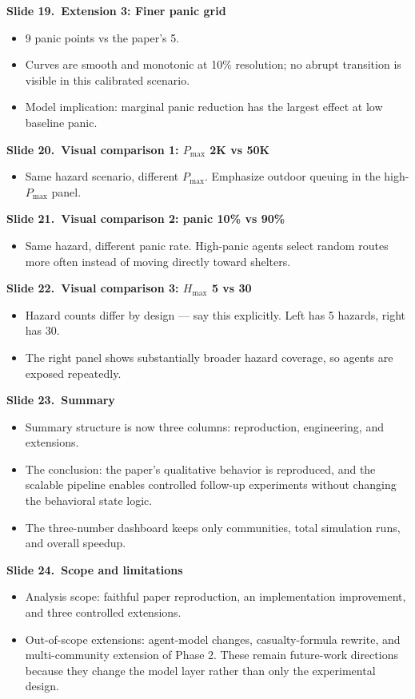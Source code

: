 \documentclass[11pt]{article}
\newcommand{\slide}[2]{\vspace{0.6em}\noindent\textbf{Slide #1.\ #2}\par\nopagebreak\vspace{0.1em}}
\begin{document}
\slide{19}{Extension 3: Finer panic grid}
\begin{itemize}
\item 9 panic points vs the paper's 5.
\item Curves are smooth and monotonic at 10\% resolution; no abrupt transition is visible in this calibrated scenario.
\item Model implication: marginal panic reduction has the largest effect at low baseline panic.
\end{itemize}

\slide{20}{Visual comparison 1: $P_{\max}$ 2K vs 50K}
\begin{itemize}
\item Same hazard scenario, different $P_{\max}$. Emphasize outdoor queuing in the high-$P_{\max}$ panel.
\end{itemize}

\slide{21}{Visual comparison 2: panic 10\% vs 90\%}
\begin{itemize}
\item Same hazard, different panic rate. High-panic agents select random routes more often instead of moving directly toward shelters.
\end{itemize}

\slide{22}{Visual comparison 3: $H_{\max}$ 5 vs 30}
\begin{itemize}
\item Hazard counts differ by design --- say this explicitly. Left has 5 hazards, right has 30.
\item The right panel shows substantially broader hazard coverage, so agents are exposed repeatedly.
\end{itemize}

\slide{23}{Summary}
\begin{itemize}
\item Summary structure is now three columns: reproduction, engineering, and extensions.
\item The conclusion: the paper's qualitative behavior is reproduced, and the scalable pipeline enables controlled follow-up experiments without changing the behavioral state logic.
\item The three-number dashboard keeps only communities, total simulation runs, and overall speedup.
\end{itemize}

\slide{24}{Scope and limitations}
\begin{itemize}
\item Analysis scope: faithful paper reproduction, an implementation improvement, and three controlled extensions.
\item Out-of-scope extensions: agent-model changes, casualty-formula rewrite, and multi-community extension of Phase 2. These remain future-work directions because they change the model layer rather than only the experimental design.
\end{itemize}
\end{document}
